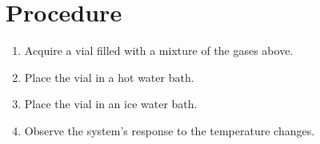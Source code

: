 
\section{Procedure}
\begin{enumerate}
    \item Acquire a vial filled with a mixture of the gases above.
    \item Place the vial in a hot water bath.
    \item Place the vial in an ice water bath.
    \item Observe the system's response to the temperature changes.
\end{enumerate}
